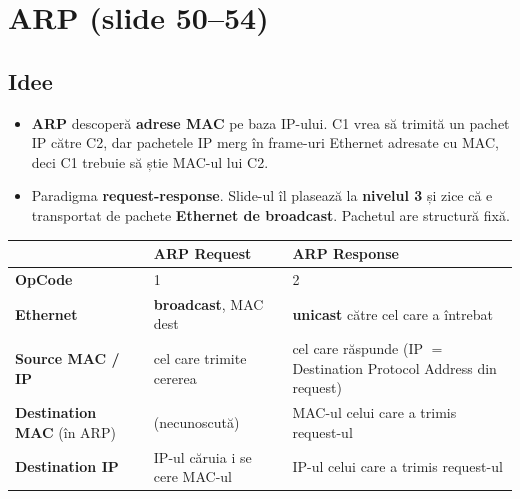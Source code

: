 \documentclass[11pt,a4paper]{article}
\begin{document}
\section{ARP (slide 50--54)}

\subsection*{Idee}
\begin{itemize}
  \item \textbf{ARP} descoperă \textbf{adrese MAC} pe baza IP-ului. C1 vrea să trimită un pachet IP către C2, dar pachetele IP merg în frame-uri Ethernet adresate cu MAC, deci C1 trebuie să știe MAC-ul lui C2.
  \item Paradigma \textbf{request-response}. Slide-ul îl plasează la \textbf{nivelul 3} și zice că e transportat de pachete \textbf{Ethernet de broadcast}. Pachetul are structură fixă.
\end{itemize}

\medskip
\renewcommand{\arraystretch}{1.35}
\small
\begin{tabularx}{\linewidth}{@{}p{3.1cm} Y Y@{}}
\toprule
 & \textbf{ARP Request} & \textbf{ARP Response}\\
\midrule
\textbf{OpCode} & 1 & 2\\
\textbf{Ethernet} & \textbf{broadcast}, MAC dest  & \textbf{unicast} către cel care a întrebat\\
\textbf{Source MAC / IP} & cel care trimite cererea & cel care răspunde (IP $=$ Destination Protocol Address din request)\\
\textbf{Destination MAC} (în ARP) &  (necunoscută) & MAC-ul celui care a trimis request-ul\\
\textbf{Destination IP} & IP-ul căruia i se cere MAC-ul & IP-ul celui care a trimis request-ul\\
\bottomrule
\end{tabularx}
\normalsize
\end{document}
